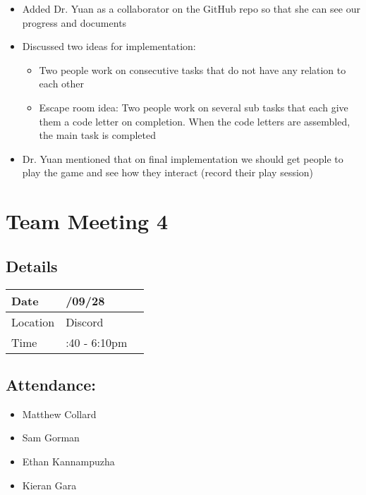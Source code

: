 \documentclass{article}
\begin{document}
\begin{itemize}
    \item Added Dr. Yuan as a collaborator on the GitHub repo so that she can see our progress and documents
    \item Discussed two ideas for implementation:
    \begin{itemize}
        \item Two people work on consecutive tasks that do not have any relation to each other
        \item Escape room idea: Two people work on several sub tasks that each give them a code letter on completion. When the code letters are assembled, the main task is completed
    \end{itemize}
    \item Dr. Yuan mentioned that on final implementation we should get people to play the game and see how they interact (record their play session)
    
    
\end{itemize}

\pagebreak
\section*{Team Meeting 4}

\subsection*{Details}

\begin{tabularx}{0.8\textwidth} { 
  | >{\raggedright\arraybackslash}X 
  | >{\centering\arraybackslash}X 
  | >{\raggedleft\arraybackslash}X | }
 \hline
 Date & 2023/09/28  \\
 \hline
 Location  & Discord  \\
\hline
Time  & 4:40 - 6:10pm  \\
\hline
\end{tabularx}


\subsection*{Attendance:}
\begin{itemize}
    \item Matthew Collard
    \item Sam Gorman
    \item Ethan Kannampuzha
    \item Kieran Gara
\end{itemize}
\end{document}
